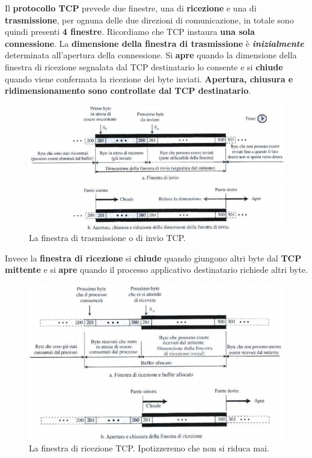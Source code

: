 \documentclass[11pt,a4paper,oneside]{book}
\theoremstyle{definition}
\begin{document}
Il \textbf{protocollo TCP} prevede due finestre, una di \textbf{ricezione} e una di \textbf{trasmissione}, per ognuna delle due direzioni di comunicazione, in totale sono quindi presenti \textbf{4 finestre}. Ricordiamo che TCP instaura \textbf{una sola connessione}. La \textbf{dimensione della finestra di trasmissione} è \textit{\textbf{inizialmente}} determinata all'apertura della connessione. Si \textbf{apre} quando la dimensione della finestra di ricezione segnalata dal TCP destinatario lo consente e si \textbf{chiude} quando viene confermata la ricezione dei byte inviati. \textbf{Apertura, chiusura e ridimensionamento sono controllate dal TCP destinatario}.
\begin{figure}[!h]
	\includegraphics[scale=0.55]{Immagini/TCP_Window.png}
	\centering
	\caption{La finestra di trasmissione o di invio TCP.}
\end{figure}\newline
Invece la \textbf{finestra di ricezione} si \textbf{chiude} quando giungono altri byte dal \textbf{TCP mittente} e si \textbf{apre} quando il processo applicativo destinatario richiede altri byte.
\begin{figure}[!h]
	\includegraphics[scale=0.54]{Immagini/Rc_window.png}
	\centering
	\caption{La finestra di ricezione TCP. Ipotizzeremo che non si riduca mai.}
\end{figure}
\end{document}
